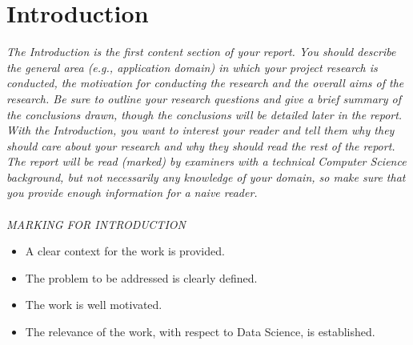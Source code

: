 \section{Introduction}
\emph{The Introduction is the first content section of your report. You should describe the general area (e.g., application domain) in which your project research is conducted, the motivation for conducting the research and the overall aims of the research. Be sure to outline your research questions and give a brief summary of the conclusions drawn, though the conclusions will be detailed later in the report. With the Introduction, you want to interest your reader and tell them why they should care about your research and why they should read the rest of the report. The report will be read (marked) by examiners with a technical Computer Science background, but not necessarily any knowledge of your domain, so make sure that you provide enough information for a naive reader.
\cite{website:fermentas-lambda}
\cite{Doe11}
\cite{Joh11}
\cite{JohSil05}
\cite{Joh12}
\cite{Joh13}
\cite{Alibaba}
\\ \\ MARKING FOR INTRODUCTION }
\begin{itemize}
	\item A clear context for the work is provided. 
	\item The problem to be addressed is clearly defined. 
	\item The work is well motivated. 
	\item The relevance of the work, with respect to Data Science, is established. 
\end{itemize} 
